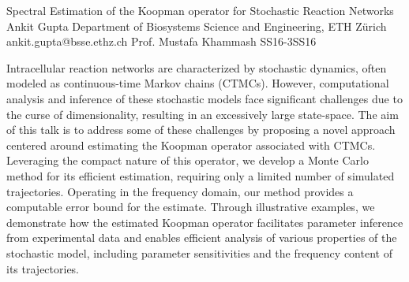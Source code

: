 \begin{talk}
  {Spectral Estimation of the Koopman operator for Stochastic Reaction Networks}%
  {Ankit Gupta}%
  {Department of Biosystems Science and Engineering, ETH Z\"{u}rich}%
  {ankit.gupta@bsse.ethz.ch}%
  {Prof. Mustafa Khammash}%
{}{}{SS16-3}{SS16}

			
Intracellular reaction networks are characterized by stochastic dynamics, often modeled as continuous-time Markov chains (CTMCs). However, computational analysis and inference of these stochastic models face significant challenges due to the curse of dimensionality, resulting in an excessively large state-space. The aim of this talk is to address some of these challenges by proposing a novel approach centered around estimating the Koopman operator associated with CTMCs. Leveraging the compact nature of this operator, we develop a Monte Carlo method for its efficient estimation, requiring only a limited number of simulated trajectories. Operating in the frequency domain, our method provides a computable error bound for the estimate. Through illustrative examples, we demonstrate how the estimated Koopman operator facilitates parameter inference from experimental data and enables efficient analysis of various properties of the stochastic model, including parameter sensitivities and the frequency content of its trajectories.
\end{talk}

